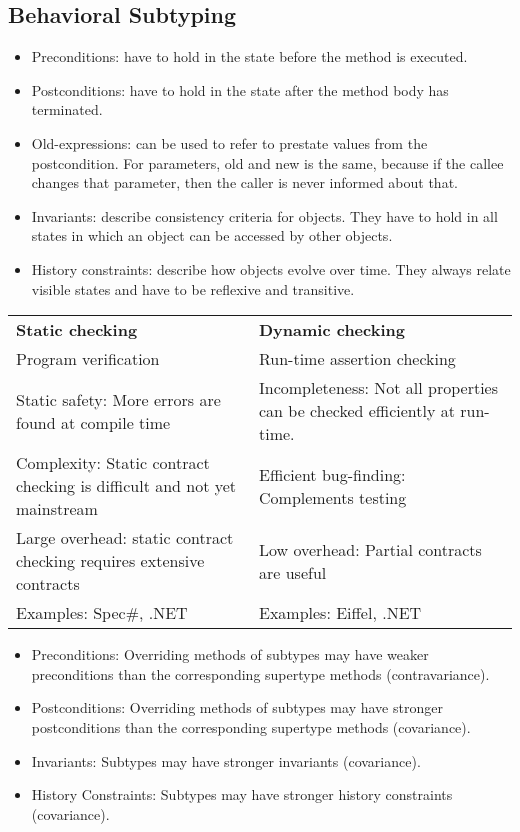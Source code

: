 \subsection{Behavioral Subtyping}
\begin{mytitle}[Contracts]\hfill
\begin{itemize}
    \item Preconditions: have to hold in the state before the method is executed.
    \item Postconditions: have to hold in the state after the method body has terminated.
    \item Old-expressions: can be used to refer to prestate values from the postcondition. For parameters, old and new is the same, because if the callee changes that parameter, then the caller is never informed about that.
    \item Invariants: describe consistency criteria for objects. They have to hold in all states in which an object can be accessed by other objects.
    \item History constraints: describe how objects evolve over time. They always relate visible states and have to be reflexive and transitive. 
\end{itemize}
\end{mytitle}
\begin{mytitle}\hfill
\begin{center}
    \begin{tabular}{R{0.4\textwidth}|L{0.4\textwidth}}
        \textbf{Static checking} & \textbf{Dynamic checking} \\
        Program verification & Run-time assertion checking\\
        \hline
        Static safety: More errors are found at compile time & Incompleteness: Not all properties can be checked efficiently at run-time.\\
        Complexity: Static contract checking is difficult and not yet mainstream & Efficient bug-finding: Complements testing\\
        Large overhead: static contract checking requires extensive contracts & Low overhead: Partial contracts are useful\\
        Examples: Spec\#, .NET & Examples: Eiffel, .NET
    \end{tabular}
\end{center}
\end{mytitle}
\begin{mytitle}\hfill
\begin{itemize}
    \item Preconditions: Overriding methods of subtypes may have weaker preconditions than the corresponding supertype methods (contravariance).
    \item Postconditions: Overriding methods of subtypes may have stronger postconditions than the corresponding supertype methods (covariance).
    \item Invariants: Subtypes may have stronger invariants (covariance).
    \item History Constraints: Subtypes may have stronger history constraints (covariance).
\end{itemize}
\end{mytitle}
